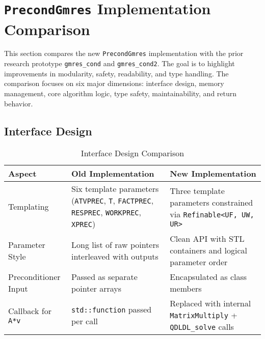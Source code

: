 \documentclass[12pt, titlepage]{article}
\begin{document}
\newpage{}

\section{\texttt{PrecondGmres} Implementation Comparison}
\label{sec:textttpr-comp}

This section compares the new \texttt{PrecondGmres} implementation with the prior
research prototype \texttt{gmres\_cond} and \texttt{gmres\_cond2}. The goal is
to highlight improvements in modularity, safety, readability, and type handling.
The comparison focuses on six major dimensions: interface design, memory
management, core algorithm logic, type safety, maintainability, and return
behavior.

\subsection*{Interface Design}

\begin{table}[H]
  \centering
  \renewcommand{\arraystretch}{1.2}
  \begin{tabularx}{\linewidth}{%
    >{\raggedright\arraybackslash}l
    >{\raggedright\arraybackslash}X
    >{\raggedright\arraybackslash}X
    }
    \toprule
    \textbf{Aspect}            & \textbf{Old Implementation}                                                                      & \textbf{New Implementation}                                              \\
    \midrule
    Templating           & Six template parameters (\texttt{ATVPREC}, \texttt{T}, \texttt{FACTPREC}, \texttt{RESPREC}, \texttt{WORKPREC}, \texttt{XPREC}) & Three template parameters constrained via \texttt{Refinable<UF, UW, UR>} \\
    Parameter Style      & Long list of raw pointers interleaved with outputs                                         & Clean API with STL containers and logical parameter order          \\
    Preconditioner Input & Passed as separate pointer arrays                                                          & Encapsulated as class members                                      \\
    Callback for \texttt{A*v}  & \texttt{std::function} passed per call                                                           & Replaced with internal \texttt{MatrixMultiply} + \texttt{QDLDL\_solve} calls   \\
    \bottomrule
  \end{tabularx}
  \caption{Interface Design Comparison}
\end{table}
\end{document}

